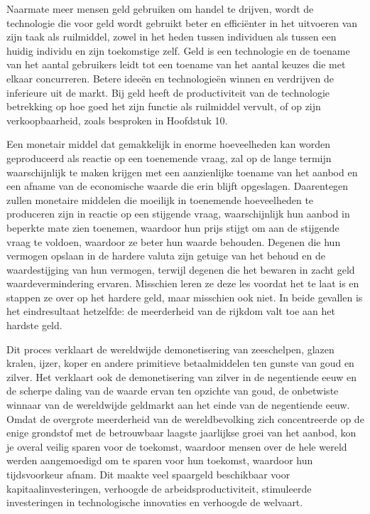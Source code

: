 Naarmate meer mensen geld gebruiken om handel te drijven, wordt de technologie die voor geld wordt gebruikt beter en efficiënter in het uitvoeren van zijn taak als ruilmiddel, zowel in het heden tussen individuen als tussen een huidig individu en zijn toekomstige zelf. Geld is een technologie en de toename van het aantal gebruikers leidt tot een toename van het aantal keuzes die met elkaar concurreren. Betere ideeën en technologieën winnen en verdrijven de inferieure uit de markt. Bij geld heeft de productiviteit van de technologie betrekking op hoe goed het zijn functie als ruilmiddel vervult, of op zijn verkoopbaarheid, zoals besproken in Hoofdstuk 10.

Een monetair middel dat gemakkelijk in enorme hoeveelheden kan worden geproduceerd als reactie op een toenemende vraag, zal op de lange termijn waarschijnlijk te maken krijgen met een aanzienlijke toename van het aanbod en een afname van de economische waarde die erin blijft opgeslagen. Daarentegen zullen monetaire middelen die moeilijk in toenemende hoeveelheden te produceren zijn in reactie op een stijgende vraag, waarschijnlijk hun aanbod in beperkte mate zien toenemen, waardoor hun prijs stijgt om aan de stijgende vraag te voldoen, waardoor ze beter hun waarde behouden. Degenen die hun vermogen opslaan in de hardere valuta zijn getuige van het behoud en de waardestijging van hun vermogen, terwijl degenen die het bewaren in zacht geld waardevermindering ervaren. Misschien leren ze deze les voordat het te laat is en stappen ze over op het hardere geld, maar misschien ook niet. In beide gevallen is het eindresultaat hetzelfde: de meerderheid van de rijkdom valt toe aan het hardste geld.

Dit proces verklaart de wereldwijde demonetisering van zeeschelpen, glazen kralen, ijzer, koper en andere primitieve betaalmiddelen ten gunste van goud en zilver. Het verklaart ook de demonetisering van zilver in de negentiende eeuw en de scherpe daling van de waarde ervan ten opzichte van goud, de onbetwiste winnaar van de wereldwijde geldmarkt aan het einde van de negentiende eeuw. Omdat de overgrote meerderheid van de wereldbevolking zich concentreerde op de enige grondstof met de betrouwbaar laagste jaarlijkse groei van het aanbod, kon je overal veilig sparen voor de toekomst, waardoor mensen over de hele wereld werden aangemoedigd om te sparen voor hun toekomst, waardoor hun tijdsvoorkeur afnam. Dit maakte veel spaargeld beschikbaar voor kapitaalinvesteringen, verhoogde de arbeidsproductiviteit, stimuleerde investeringen in technologische innovaties en verhoogde de welvaart.

